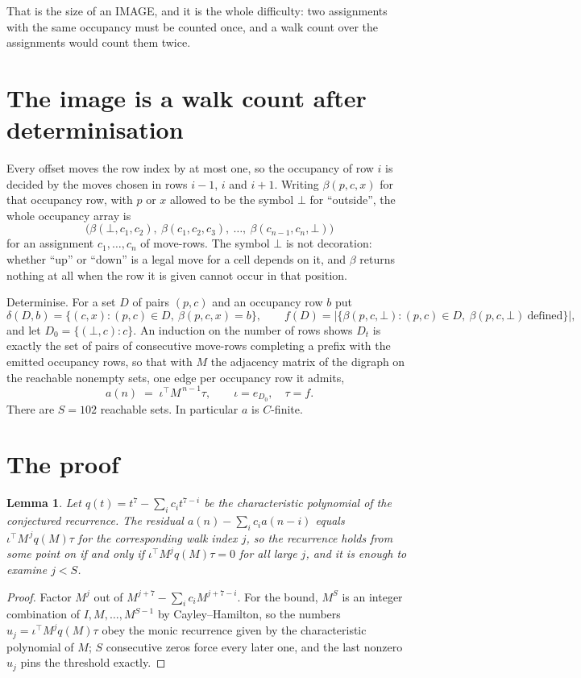 \documentclass[11pt,a4paper]{article}
\theoremstyle{plain}
\newtheorem{lemma}[theorem]{Lemma}
\theoremstyle{definition}
\begin{document}
That is the size of an IMAGE, and it is the whole difficulty: two assignments with the same
occupancy must be counted once, and a walk count over the assignments would count them twice.

\section{The image is a walk count after determinisation}

Every offset moves the row index by at most one, so the occupancy of row $i$ is decided by the
moves chosen in rows $i-1$, $i$ and $i+1$. Writing $\beta(p,c,x)$ for that occupancy row, with
$p$ or $x$ allowed to be the symbol $\bot$ for ``outside'', the whole occupancy array is
\[
\bigl(\beta(\bot,c_1,c_2),\ \beta(c_1,c_2,c_3),\ \dots,\ \beta(c_{n-1},c_n,\bot)\bigr)
\]
for an assignment $c_1,\dots,c_n$ of move-rows. The symbol $\bot$ is not decoration: whether
``up'' or ``down'' is a legal move for a cell depends on it, and $\beta$ returns nothing at all
when the row it is given cannot occur in that position.

Determinise. For a set $D$ of pairs $(p,c)$ and an occupancy row $b$ put
\[
\delta(D,b)=\{(c,x):(p,c)\in D,\ \beta(p,c,x)=b\},\qquad
f(D)=\bigl|\{\beta(p,c,\bot):(p,c)\in D,\ \beta(p,c,\bot)\ \text{defined}\}\bigr| ,
\]
and let $D_0=\{(\bot,c):c\}$. An induction on the number of rows shows $D_t$ is exactly the
set of pairs of consecutive move-rows completing a prefix with the emitted occupancy rows, so
that with $M$ the adjacency matrix of the digraph on the reachable nonempty sets, one edge per
occupancy row it admits,
\[
a(n)\;=\;\iota^{\!\top}M^{\,n-1}\tau,\qquad \iota=e_{D_0},\quad \tau=f .
\]
There are $S=102$ reachable sets. In particular $a$ is $C$-finite.

\section{The proof}

\begin{lemma}\label{lem:crit}
Let $q(t)=t^{7}-\sum_i c_it^{7-i}$ be the characteristic polynomial of the
conjectured recurrence. The residual $a(n)-\sum_ic_ia(n-i)$ equals
$\iota^{\!\top}M^{\,j}q(M)\tau$ for the corresponding walk index $j$, so the recurrence
holds from some point on if and only if $\iota^{\!\top}M^{j}q(M)\tau=0$ for all large $j$,
and it is enough to examine $j<S$.
\end{lemma}

\begin{proof}
Factor $M^{j}$ out of $M^{j+7}-\sum_ic_iM^{j+7-i}$. For the bound, $M^{S}$
is an integer combination of $I,M,\dots,M^{S-1}$ by Cayley--Hamilton, so the numbers
$u_j=\iota^{\!\top}M^{j}q(M)\tau$ obey the monic recurrence given by the characteristic
polynomial of $M$; $S$ consecutive zeros force every later one, and the last nonzero $u_j$
pins the threshold exactly.
\end{proof}
\end{document}
